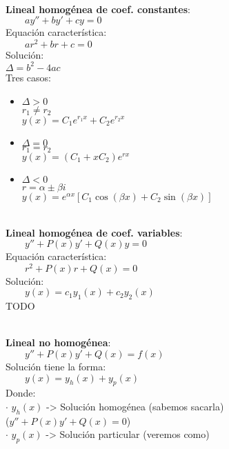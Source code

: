 \documentclass[a4paper,landscape,10pt]{cheatsheet}
\begin{document}
\hfill\\
\textbf{Lineal homogénea de coef. constantes}:\\
$\qquad ay''+by'+cy=0$\\
Equación característica:\\
$\qquad ar^2+br+c=0$\\
Solución:\\
$\Delta = b^2-4ac$\\
\qquad Tres casos:
\begin{itemize}
  \item $\Delta>0$\\
        $r_1 \neq r_2$\\
        $y(x)=C_1e^{r_1x}+C_2e^{r_2x}$\\
  \item $\Delta=0$\\
        $r_1 = r_2$\\
        $y(x)=(C_1+xC_2)e^{rx}$\\
  \item $\Delta<0$\\
        $r=\alpha\pm\beta i$\\
        $y(x)=e^{\alpha x}\left[C_1\cos(\beta x)+C_2\sin(\beta x)\right]$\\
\end{itemize}

\hfill\\
\textbf{Lineal homogénea de coef. variables}:\\
$\qquad y''+P(x)y'+Q(x)y=0$\\
Equación característica:\\
$\qquad r^2+P(x)r+Q(x)=0$\\
Solución:\\
$\qquad y(x)=c_1y_1(x)+c_2y_2(x)$\\
TODO\\
\qquad

\hfill\\
\textbf{Lineal no homogénea}:\\
$\qquad y''+P(x)y'+Q(x)=f(x)$\\
Solución tiene la forma:\\
$\qquad y(x)=y_h(x) + y_p(x)$\\
\qquad Donde:\\
\qquad\qquad $\cdot$ $y_h(x)$ -> Solución homogénea (sabemos sacarla)\\
\qquad\qquad\qquad ($y''+P(x)y'+Q(x)=0$)\\
\qquad\qquad $\cdot$ $y_p(x)$ -> Solución particular (veremos como)\\
\end{document}
